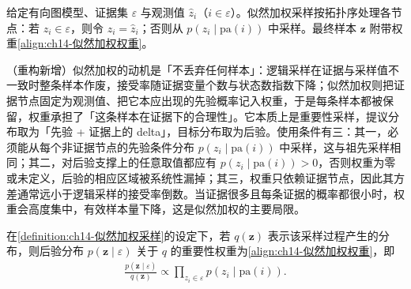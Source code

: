 \documentclass[../../main.tex]{subfiles}
\begin{document}
\begin{definition}[似然加权采样]\label{definition:ch14-似然加权采样}
给定有向图模型、证据集 $\varepsilon$ 与观测值 $\hat{z}_{i}$（$i\in\varepsilon$）。似然加权采样按拓扑序处理各节点：若 $z_{i}\in\varepsilon$，则令 $z_{i}=\hat{z}_{i}$；否则从 $p\!\left(z_{i}\mid\mathrm{pa}(i)\right)$ 中采样。最终样本 $\bm{z}$ 附带权重\eqref{align:ch14-似然加权权重}。
\end{definition}

\begin{remark}（重构新增）似然加权的动机是「不丢弃任何样本」：逻辑采样在证据与采样值不一致时整条样本作废，接受率随证据变量个数与状态数指数下降；似然加权则把证据节点固定为观测值、把它本应出现的先验概率记入权重，于是每条样本都被保留，权重承担了「这条样本在证据下的合理性」。它本质上是重要性采样，提议分布取为「先验 + 证据上的 delta」，目标分布取为后验。使用条件有三：其一，必须能从每个非证据节点的先验条件分布 $p\!\left(z_{i}\mid\mathrm{pa}(i)\right)$ 中采样，这与祖先采样相同；其二，对后验支撑上的任意取值都应有 $p\!\left(z_{i}\mid\mathrm{pa}(i)\right)>0$，否则权重为零或未定义，后验的相应区域被系统性漏掉；其三，权重只依赖证据节点，因此其方差通常远小于逻辑采样的接受率倒数。当证据很多且每条证据的概率都很小时，权重会高度集中，有效样本量下降，这是似然加权的主要局限。\end{remark}

\begin{proposition}[似然加权采样的权重]\label{proposition:ch14-似然加权权重}
在\cref{definition:ch14-似然加权采样}的设定下，若 $q(\bm{z})$ 表示该采样过程产生的分布，则后验分布 $p\!\left(\bm{z}\mid\varepsilon\right)$ 关于 $q$ 的重要性权重为\eqref{align:ch14-似然加权权重}，即
\begin{align*}
\frac{p\!\left(\bm{z}\mid\varepsilon\right)}{q(\bm{z})}\propto\prod_{z_{i}\in\varepsilon}p\!\left(z_{i}\mid\mathrm{pa}(i)\right).
\end{align*}
\end{proposition}
\end{document}
